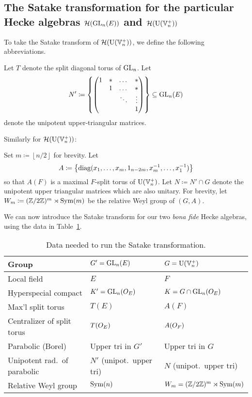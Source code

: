 \subsection{The Satake transformation for the particular Hecke algebras $\mathcal H(\operatorname{GL}_n(E))$ and $\mathcal H(\operatorname{U}(\mathbb V_n^+))$}
To take the Satake transform of $\mathcal H(\operatorname{U}(\mathbb V_n^+))$, we define the following abbreviations.
\begin{itemize}
  \ii Let $T$ denote the split diagonal torus of $\operatorname{GL}_n$.
  \ii Let
  \[ N' \coloneqq \left\{ \begin{pmatrix}
      1 & \ast & \dots & \ast \\
        & 1 & \dots & \ast \\
        &   & \ddots & \vdots \\
        &   &   & 1 \end{pmatrix}\right\} \subseteq \operatorname{GL}_n(E) \]
  denote the unipotent upper-triangular matrices.
\end{itemize}
Similarly for $\mathcal H(\operatorname{U}(\mathbb V_n^+))$:
\begin{itemize}
  \ii Set $m \coloneqq \left\lfloor n/2 \right\rfloor$ for brevity.
  \ii Let
  \[ A \coloneqq \left\{
    \operatorname{diag}(x_1, \dots, x_m, 1_{n-2m}, x_m^{-1}, \dots, x_1^{-1}) \right\} \]
  so that $A(F)$ is a maximal $F$-split torus of $\operatorname{U}(\mathbb V_n^+)$.
  \ii Let $N \coloneqq N' \cap G$ denote the unipotent upper triangular matrices
  which are also unitary.
  \ii For brevity, let $W_m \coloneqq (\mathbb Z/2\mathbb Z)^m \rtimes \operatorname{Sym}(m)$
  be the relative Weyl group of $(G,A)$.
\end{itemize}

We can now introduce the Satake transform for our two
\emph{bona fide} Hecke algebras, using the data in Table~\ref{tab:satakestuff}.

\begin{table}[ht]
  \centering
  \begin{tabular}{lll}
    \toprule
    Group & $G' = \operatorname{GL}_n(E)$ & $G = \operatorname{U}(\mathbb V_n^+)$ \\ \midrule
    Local field & $E$ & $F$ \\\hline
    Hyperspecial compact & $K' = \operatorname{GL}_n(O_E)$ & $K = G \cap \operatorname{GL}_n(O_E)$ \\\hline
    Max'l split torus & $T(E)$ & $A(F)$ \\\hline
    Centralizer of split torus & $T(O_E)$ & $A(O_F)$ \\\hline
    Parabolic (Borel) & Upper tri in $G'$ & Upper tri in $G$ \\\hline
    Unipotent rad.\ of parabolic & $N'$ (unipot.\ upper tri) & $N$ (unipot.\ upper tri) \\\hline
    Relative Weyl group & $\operatorname{Sym}(n)$ & $W_m = (\mathbb Z/2\mathbb Z)^m \rtimes \operatorname{Sym}(m)$ \\
    \bottomrule
  \end{tabular}
  \caption{Data needed to run the Satake transformation.}
  \label{tab:satakestuff}
\end{table}

